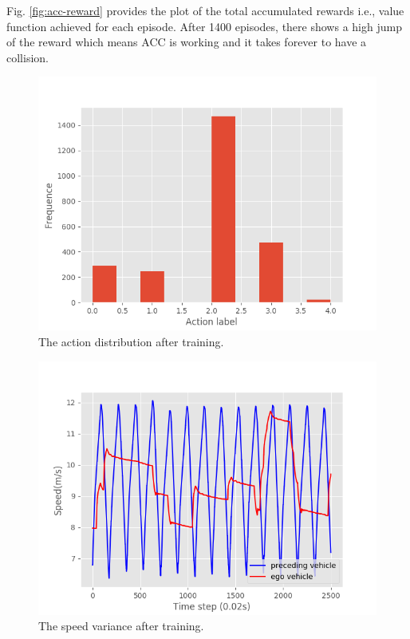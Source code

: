 Fig. \ref{fig:acc-reward} provides the plot of the total accumulated rewards i.e., value function achieved for each episode. After 1400 episodes, there shows a high jump of the reward which means ACC is working and it takes forever to have a collision.

\begin{figure}[h]
\centering
\includegraphics[width=1.0\textwidth]{figs/ch5/acc_action_distribution}
\caption{The action distribution after training.}
\label{fig:acc-action}
\end{figure}

\begin{figure}[h]
\centering
\includegraphics[width=1.0\textwidth]{figs/ch5/vel_variance}
\caption{The speed variance after training.}
\label{fig:acc-vel}
\end{figure}

